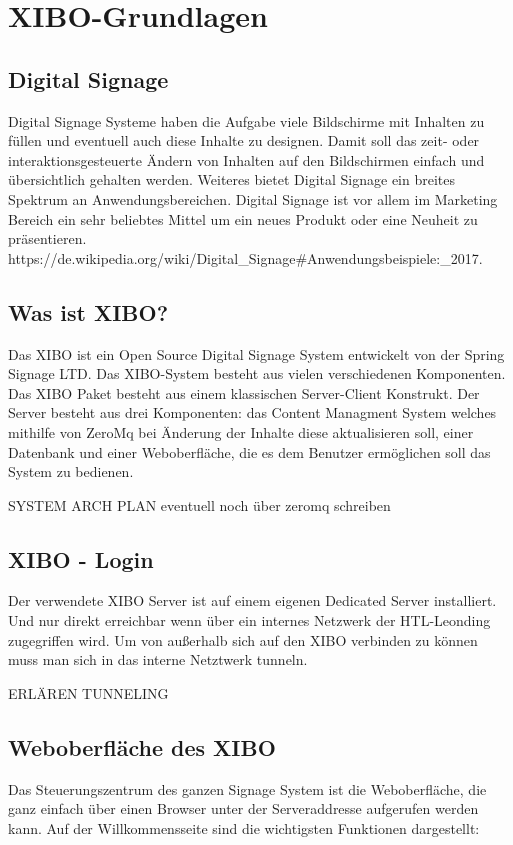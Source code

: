 \chapter{XIBO-Grundlagen}
\section{Digital Signage}\label{sec:digitalsignage}
Digital Signage Systeme haben die Aufgabe viele Bildschirme mit Inhalten zu füllen und eventuell auch diese Inhalte zu designen. Damit soll das zeit- oder interaktionsgesteuerte Ändern von Inhalten auf den Bildschirmen einfach und übersichtlich gehalten werden. Weiteres bietet Digital Signage ein breites Spektrum an Anwendungsbereichen.   
Digital Signage ist vor allem im Marketing Bereich ein sehr beliebtes Mittel um ein neues Produkt oder eine Neuheit zu präsentieren. https://de.wikipedia.org/wiki/Digital_Signage#Anwendungsbeispiele:_2017.

\section{Was ist XIBO?}\label{sec:xibo}
Das XIBO ist ein Open Source Digital Signage System entwickelt von der Spring Signage LTD. Das XIBO-System besteht aus vielen verschiedenen Komponenten. Das XIBO Paket besteht aus einem klassischen Server-Client Konstrukt. Der Server besteht aus drei Komponenten: das Content Managment System welches mithilfe von ZeroMq bei Änderung der Inhalte diese aktualisieren soll, einer Datenbank und einer Weboberfläche, die es dem Benutzer ermöglichen soll das System zu bedienen.

SYSTEM ARCH PLAN eventuell noch über zeromq schreiben

\section{XIBO - Login}\label{sec:xibo}
Der verwendete XIBO Server ist auf einem eigenen Dedicated Server installiert. Und nur direkt erreichbar wenn über ein internes Netzwerk der HTL-Leonding zugegriffen wird. Um von außerhalb sich auf den XIBO verbinden zu können muss man sich in das interne Netztwerk tunneln. 

ERLÄREN TUNNELING




\section{Weboberfläche des XIBO}\label{sec:webpagexibo}
Das Steuerungszentrum des ganzen Signage System ist die Weboberfläche, die ganz einfach über einen Browser unter der Serveraddresse aufgerufen werden kann. Auf der Willkommensseite sind die wichtigsten Funktionen dargestellt:


